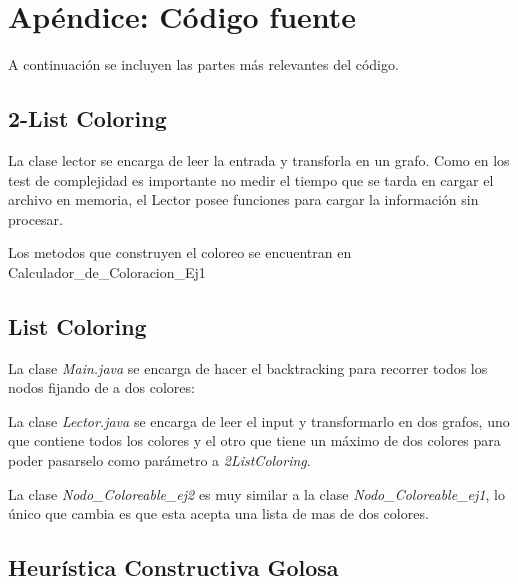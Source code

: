 \newpage
\section{Apéndice: Código fuente}

A continuación se incluyen las partes más relevantes del código.\\

\subsection{2-List Coloring}

La clase lector se encarga de leer la entrada y transforla en un grafo. Como en los test de complejidad es importante no medir el tiempo que se tarda en cargar el archivo en memoria, el Lector posee funciones para cargar la información sin procesar.

Los metodos que construyen el coloreo se encuentran en Calculador_de_Coloracion_Ej1 \\



\subsection{List Coloring}

La clase \emph{Main.java} se encarga de hacer el backtracking para recorrer todos los nodos fijando de a dos colores:

La clase \emph{Lector.java} se encarga de leer el input y transformarlo en dos grafos, uno que contiene todos los colores y el otro que tiene un máximo de dos colores para poder pasarselo como parámetro a \emph{2ListColoring}.

La clase \emph{Nodo_Coloreable_ej2} es muy similar a la clase \emph{Nodo_Coloreable_ej1}, lo único que cambia es que esta acepta una lista de mas de dos colores.



\subsection{Heurística Constructiva Golosa}


